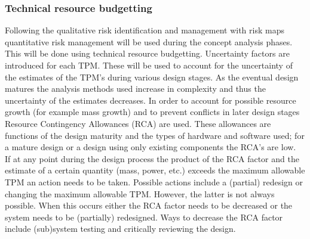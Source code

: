 \subsubsection{Technical resource budgetting}
Following the qualitative risk identification and management with risk maps quantitative risk management will be used during the concept analysis phases. This will be done using technical resource budgetting. Uncertainty factors are introduced for each TPM. These will be used to account for the uncertainty of the estimates of the TPM's during various design stages. As the eventual design matures the analysis methods used increase in complexity and thus the uncertainty of the estimates decreases. In order to account for possible resource growth (for example mass growth) and to prevent conflicts in later design stages Resource Contingency Allowances (RCA) are used. These allowances are functions of the design maturity and the types of hardware and software used; for a mature design or a design using only existing components the RCA's are low. \\
\noindent If at any point during the design process the product of the RCA factor and the estimate of a certain quantity (mass, power, etc.) exceeds the maximum allowable TPM an action needs to be taken. Possible actions include a (partial) redesign or changing the maximum allowable TPM. However, the latter is not always possible. When this occurs either the RCA factor needs to be decreased or the system needs to be (partially) redesigned. Ways to decrease the RCA factor include (sub)system testing and critically reviewing the design.